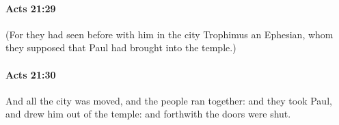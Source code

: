 		\paragraph{Acts 21:29} %
			\label{ACTS-21-29}

			(For they had seen before with him in the city Trophimus an Ephesian, whom they supposed that Paul had brought into the temple.)

			\begin{framed}
			\scriptsize
				\begin{compactdesc}
					\item[SBLG] 
				\end{compactdesc}
			\end{framed}

		\paragraph{Acts 21:30} %
			\label{ACTS-21-30}

			And all the city was moved, and the people ran together: and they took Paul, and drew him out of the temple: and forthwith the doors were shut.

